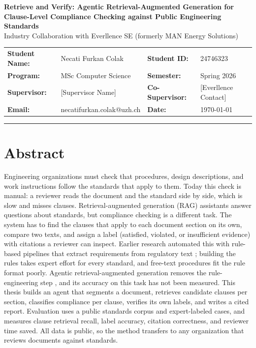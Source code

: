 \documentclass[10pt,a4paper]{article}
\begin{document}
\begin{center}
    {\Large \textbf{Retrieve and Verify: Agentic Retrieval-Augmented Generation for\\[0.15em]Clause-Level Compliance Checking against Public Engineering Standards}}\\[0.3em]
    {\normalsize Industry Collaboration with Everllence SE (formerly MAN Energy Solutions)}
\end{center}

\vspace{0.35em}

\noindent
\begin{tabularx}{\textwidth}{>{\bfseries}l X >{\bfseries}l X}
Student Name: & Necati Furkan Colak       & Student ID:    & 24746323 \\
Program:      & MSc Computer Science      & Semester:      & Spring 2026 \\
Supervisor:   & [Supervisor Name]         & Co-Supervisor: & [Everllence Contact] \\
Email:        & necatifurkan.colak@uzh.ch & Date:          & \today \\
\end{tabularx}

\vspace{0.5em}
\hrule
\vspace{0.5em}

\section{Abstract}

Engineering organizations must check that procedures, design descriptions, and work instructions follow the standards that apply to them. Today this check is manual: a reviewer reads the document and the standard side by side, which is slow and misses clauses. Retrieval-augmented generation (RAG) assistants answer questions about standards, but compliance checking is a different task. The system has to find the clauses that apply to each document section on its own, compare two texts, and assign a label (satisfied, violated, or insufficient evidence) with citations a reviewer can inspect. Earlier research automated this with rule-based pipelines that extract requirements from regulatory text \cite{zhang2016}; building the rules takes expert effort for every standard, and free-text procedures fit the rule format poorly. Agentic retrieval-augmented generation removes the rule-engineering step \cite{yao2023react, singh2025agentic}, and its accuracy on this task has not been measured. This thesis builds an agent that segments a document, retrieves candidate clauses per section, classifies compliance per clause, verifies its own labels, and writes a cited report. Evaluation uses a public standards corpus and expert-labeled cases, and measures clause retrieval recall, label accuracy, citation correctness, and reviewer time saved. All data is public, so the method transfers to any organization that reviews documents against standards.
\end{document}
